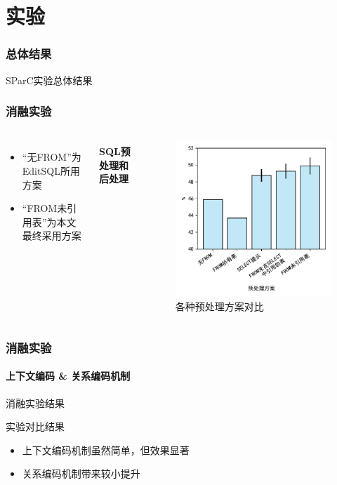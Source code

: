 \documentclass{ctexbeamer}
\begin{document}
\section{实验}
\begin{frame}
  \frametitle{总体结果}
  \begin{table}
    
    \caption{SParC实验总体结果}
  \end{table}
\end{frame}
\begin{frame}
  \frametitle{消融实验}
  \begin{columns}
    \begin{itemize}
      \item “无FROM”为EditSQL所用方案
      \item “FROM未引用表”为本文最终采用方案
    \end{itemize}
    \framesubtitle{SQL预处理和后处理}
    \begin{figure}
      \includegraphics[height=0.68\textheight]{figure/preprocess.pdf}
      \caption{各种预处理方案对比}
    \end{figure}
  \end{columns}
\end{frame}
\begin{frame}
  \frametitle{消融实验}
  \framesubtitle{上下文编码 \& 关系编码机制}
  \begin{table}
    
    \caption{消融实验结果}
  \end{table}
  \begin{block}{实验对比结果}
    \begin{itemize}
      \item 上下文编码机制虽然简单，但效果显著
      \item 关系编码机制带来较小提升
    \end{itemize}
  \end{block}
\end{frame}
\end{document}
